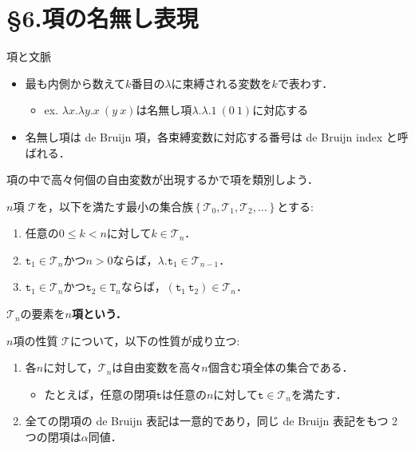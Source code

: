 \documentclass[9pt]{beamer}
\begin{document}
\section{\S 6.項の名無し表現}
\begin{frame}{項と文脈}
\begin{itemize}
\item 最も内側から数えて$k$番目の$\lambda$に束縛される変数を$k$で表わす．\begin{itemize}
	\item ex. $\lambda x. \lambda y. x\ (y\ x)$は名無し項$\lambda.\lambda.1\ (0\ 1)$に対応する
\end{itemize}
\item 名無し項は de Bruijn 項，各束縛変数に対応する番号は de Bruijn index と呼ばれる．
\end{itemize}
項の中で高々何個の自由変数が出現するかで項を類別しよう．
\begin{dblock}{$n$項}
$\mathcal{T}$を，以下を満たす最小の集合族$\left\{\mathcal{T}_{0}, \mathcal{T}_{1}, \mathcal{T}_{2},\ldots\right\}$とする:
\begin{enumerate}
\item 任意の$0 \leq  k < n$に対して$k\in\mathcal{T}_{n}$．
\item $\mathtt{t}_{1}\in\mathcal{T}_{n}$かつ$n > 0$ならば，$\lambda .\mathtt{t}_{1}\in\mathcal{T}_{n - 1}$．
\item $\mathtt{t}_{1}\in\mathcal{T}_{n}$かつ$\mathtt{t}_{2}\in\mathtt{T}_{n}$ならば，$\left(\mathtt{t}_{1}\ \mathtt{t}_{2}\right)\in\mathcal{T}_{n}$．
\end{enumerate}
$\mathcal{T}_{n}$の要素を\bf{$n$項}という．

\end{dblock}
\end{frame}
\begin{frame}{$n$項の性質}
$\mathcal{T}$について，以下の性質が成り立つ:
\begin{enumerate}
\item 各$n$に対して，$\mathcal{T}_{n}$は自由変数を高々$n$個含む項全体の集合である．\begin{itemize}
\item たとえば，任意の閉項$\mathtt{t}$は任意の$n$に対して$\mathtt{t}\in\mathcal{T}_{n}$を満たす．
\end{itemize}
\item 全ての閉項の de Bruijn 表記は一意的であり，同じ de Bruijn 表記をもつ 2 つの閉項は$\alpha$同値．
\end{enumerate}
\end{frame}
\end{document}
